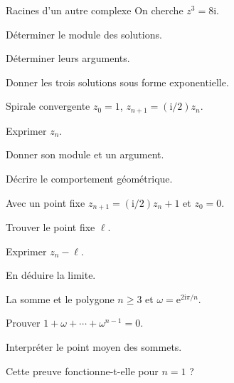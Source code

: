 \begingroup\renewcommand{\otBesoinPlace}[1]{}\begin{minipage}{\linewidth}
\begin{exercice}[3]{Racines d’un autre complexe}
On cherche $z^3=8\mathrm i$.
\begin{questions}
\item Déterminer le module des solutions.
\item Déterminer leurs arguments.
\item Donner les trois solutions sous forme exponentielle.
\end{questions}
\end{exercice}
\begin{exercice}[3]{Spirale convergente}
$z_0=1$, $z_{n+1}=(\mathrm i/2)z_n$.
\begin{questions}
\item Exprimer $z_n$.
\item Donner son module et un argument.
\item Décrire le comportement géométrique.
\end{questions}
\end{exercice}
\begin{exercice}[3]{Avec un point fixe}
$z_{n+1}=(\mathrm i/2)z_n+1$ et $z_0=0$.
\begin{questions}
\item Trouver le point fixe $\ell$.
\item Exprimer $z_n-\ell$.
\item En déduire la limite.
\end{questions}
\end{exercice}
\begin{exercice}[3]{La somme et le polygone}
$n\geq3$ et $\omega=\mathrm e^{2\mathrm i\pi/n}$.
\begin{questions}
\item Prouver $1+\omega+\cdots+\omega^{n-1}=0$.
\item Interpréter le point moyen des sommets.
\item Cette preuve fonctionne-t-elle pour $n=1$ ?
\end{questions}
\end{exercice}
\end{minipage}\endgroup

